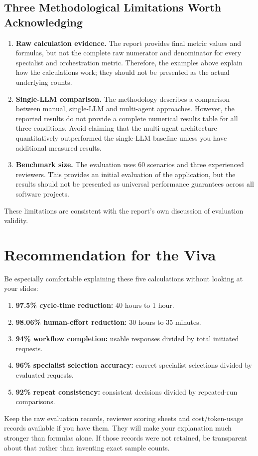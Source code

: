 \documentclass[11pt,a4paper]{article}
\begin{document}
\subsection{Three Methodological Limitations Worth Acknowledging}

\begin{enumerate}
  \item \textbf{Raw calculation evidence.} The report provides final metric values and formulas, but not the complete raw numerator and denominator for every specialist and orchestration metric. Therefore, the examples above explain how the calculations work; they should not be presented as the actual underlying counts.

  \item \textbf{Single-LLM comparison.} The methodology describes a comparison between manual, single-LLM and multi-agent approaches. However, the reported results do not provide a complete numerical results table for all three conditions. Avoid claiming that the multi-agent architecture quantitatively outperformed the single-LLM baseline unless you have additional measured results.

  \item \textbf{Benchmark size.} The evaluation uses 60 scenarios and three experienced reviewers. This provides an initial evaluation of the application, but the results should not be presented as universal performance guarantees across all software projects.
\end{enumerate}

These limitations are consistent with the report's own discussion of evaluation validity.

\section{Recommendation for the Viva}

Be especially comfortable explaining these five calculations without looking at your slides:

\begin{enumerate}
  \item \textbf{97.5\% cycle-time reduction:} 40 hours to 1 hour.
  \item \textbf{98.06\% human-effort reduction:} 30 hours to 35 minutes.
  \item \textbf{94\% workflow completion:} usable responses divided by total initiated requests.
  \item \textbf{96\% specialist selection accuracy:} correct specialist selections divided by evaluated requests.
  \item \textbf{92\% repeat consistency:} consistent decisions divided by repeated-run comparisons.
\end{enumerate}

Keep the raw evaluation records, reviewer scoring sheets and cost/token-usage records available if you have them. They will make your explanation much stronger than formulas alone. If those records were not retained, be transparent about that rather than inventing exact sample counts.
\end{document}
